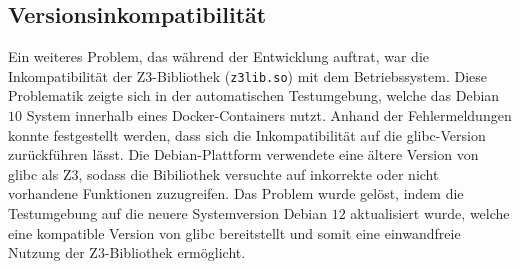 \subsection{Versionsinkompatibilität}

Ein weiteres Problem, das während der Entwicklung auftrat, war die Inkompatibilität der Z3-Bibliothek (\texttt{z3lib.so}) mit dem Betriebssystem.
Diese Problematik zeigte sich in der automatischen Testumgebung, welche das Debian $10$ System innerhalb eines Docker-Containers nutzt.
Anhand der Fehlermeldungen konnte festgestellt werden, dass sich die Inkompatibilität auf die glibc-Version zurückführen lässt.
Die Debian-Plattform verwendete eine ältere Version von glibc als Z3, sodass die Bibiliothek versuchte auf inkorrekte oder nicht vorhandene Funktionen zuzugreifen.
Das Problem wurde gelöst, indem die Testumgebung auf die neuere Systemversion Debian $12$ aktualisiert wurde,
welche eine kompatible Version von glibc bereitstellt und somit eine einwandfreie Nutzung der Z3-Bibliothek ermöglicht.
